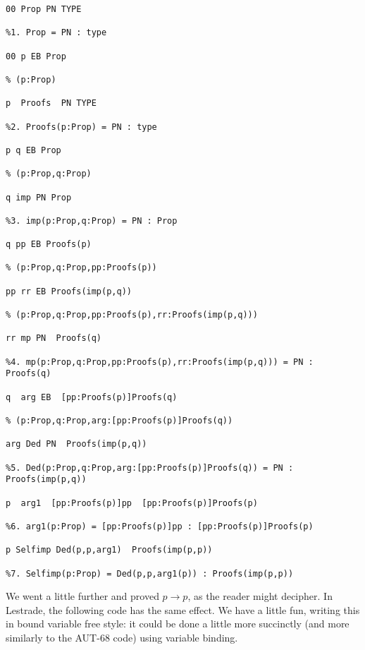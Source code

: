 \documentclass{article}
\begin{document}
   \begin{verbatim}
00 Prop PN TYPE

%1. Prop = PN : type

00 p EB Prop

% (p:Prop)

p  Proofs  PN TYPE

%2. Proofs(p:Prop) = PN : type

p q EB Prop

% (p:Prop,q:Prop)

q imp PN Prop

%3. imp(p:Prop,q:Prop) = PN : Prop

q pp EB Proofs(p)

% (p:Prop,q:Prop,pp:Proofs(p))

pp rr EB Proofs(imp(p,q))

% (p:Prop,q:Prop,pp:Proofs(p),rr:Proofs(imp(p,q)))

rr mp PN  Proofs(q)

%4. mp(p:Prop,q:Prop,pp:Proofs(p),rr:Proofs(imp(p,q))) = PN : Proofs(q)

q  arg EB  [pp:Proofs(p)]Proofs(q)

% (p:Prop,q:Prop,arg:[pp:Proofs(p)]Proofs(q))

arg Ded PN  Proofs(imp(p,q))

%5. Ded(p:Prop,q:Prop,arg:[pp:Proofs(p)]Proofs(q)) = PN : Proofs(imp(p,q))

p  arg1  [pp:Proofs(p)]pp  [pp:Proofs(p)]Proofs(p)

%6. arg1(p:Prop) = [pp:Proofs(p)]pp : [pp:Proofs(p)]Proofs(p)

p Selfimp Ded(p,p,arg1)  Proofs(imp(p,p))

%7. Selfimp(p:Prop) = Ded(p,p,arg1(p)) : Proofs(imp(p,p))
\end{verbatim}

We went a little further and proved $p \rightarrow p$, as the reader might decipher.  In Lestrade, the following code has the same effect.  We have a little fun, writing this in bound variable free style:  it could be done a little more succinctly (and more similarly to the AUT-68 code) using variable binding.
\end{document}
